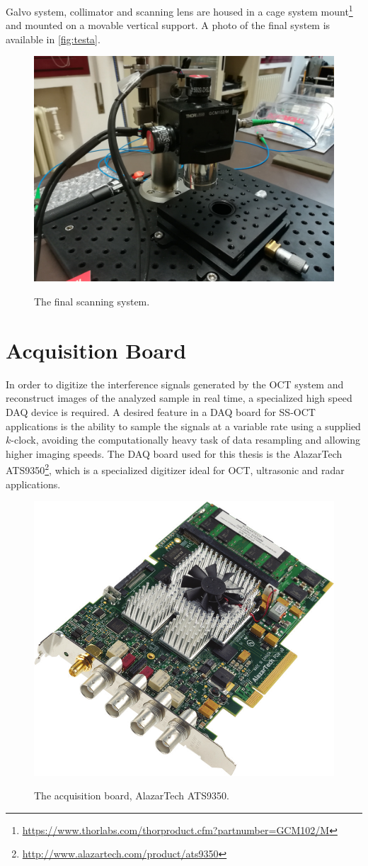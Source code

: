 Galvo system, collimator and scanning lens are housed in a cage system mount\footnote{\url{https://www.thorlabs.com/thorproduct.cfm?partnumber=GCM102/M}} and mounted on a movable vertical support. A photo of the final system is available in \autoref{fig:testa}.

\begin{figure}[bth]
	\myfloatalign
	{\includegraphics[width=0.5\linewidth]{gfx/ch3/testa}}
	\caption{The final scanning system.}\label{fig:testa}
\end{figure}
	
	\newpage
\section{Acquisition Board}
	
	In order to digitize the interference signals generated by the OCT system and reconstruct images of the analyzed sample in real time, a specialized high speed \acf{DAQ} device is required. A desired feature in a \ac{DAQ} board for SS-OCT applications is the ability to sample the signals at a variable rate using a supplied $k$-clock, avoiding the computationally heavy task of data resampling and allowing higher imaging speeds. The \ac{DAQ} board used for this thesis is the AlazarTech ATS9350\footnote{\url{http://www.alazartech.com/product/ats9350}}, which is a specialized digitizer ideal for OCT, ultrasonic and radar applications. 
	
	
	\begin{figure}[bth]
		\myfloatalign
		{\includegraphics[width=.6\linewidth]{gfx/board}}
		\caption{The acquisition board, AlazarTech ATS9350.}\label{fig:acq-board}
	\end{figure}

